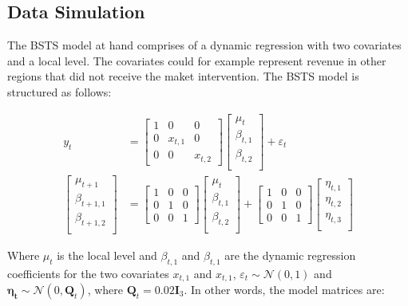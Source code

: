 \documentclass[12pt]{article}
\begin{document}
\subsection{Data Simulation}\label{dataset}
The BSTS model at hand comprises of a dynamic regression with two covariates and a local level. The covariates could for example represent revenue in other regions that did not receive the maket intervention. The BSTS model is structured as follows:

\begin{align}
y_t &= \begin{bmatrix} \label{q1}
1 & 0 & 0\\
0 & x_{t, 1} & 0\\
0 & 0 & x_{t, 2}
\end{bmatrix} \begin{bmatrix}
\mu_{t} \\
\beta_{t, 1} \\
\beta_{t, 2} \\
\end{bmatrix} +
\varepsilon_{t} \\
\begin{bmatrix} \label{q2}
\mu_{t+1} \\
\beta_{t+1, 1} \\
\beta_{t+1, 2} \\
\end{bmatrix} &=  \begin{bmatrix}
1 & 0 & 0\\
0 & 1 & 0\\
0 & 0 & 1
\end{bmatrix}  \begin{bmatrix}
\mu_{t} \\
\beta_{t, 1} \\
\beta_{t, 2} \\
\end{bmatrix} + \begin{bmatrix}
1 & 0 & 0\\
0 & 1 & 0\\
0 & 0 & 1
\end{bmatrix}  \begin{bmatrix}
\eta_{t, 1} \\
\eta_{t, 2}  \\
\eta_{t, 3}  \\
\end{bmatrix} 
\end{align}

Where $\mu_t$ is the local level and $\beta_{t, 1}$ and   $\beta_{t, 1}$ are the dynamic regression coefficients for the two covariates $x_{t, 1}$ and   $x_{t, 1}$, $\varepsilon_t \sim \mathcal{N}(0, 1)$ and $\boldsymbol{\eta_t} \sim \mathcal{N}(0, \boldsymbol{Q}_t)$, where $\boldsymbol{Q}_t = 0.02 \boldsymbol{I}_{3}$. In other words, the model matrices are:
\end{document}
